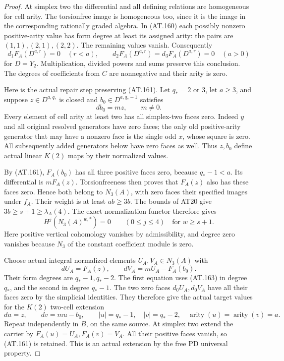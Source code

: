 \begin{proof}
At simplex two the differential and all defining
relations are homogeneous for cell arity.
The torsionfree image is homogeneous too, since
it is the image in the corresponding rationally
graded algebra. In (AT.160) each possibly nonzero
positive-arity value has form degree at least its
assigned arity: the pairs are $(1,1),(2,1),(2,2)$.
The remaining values vanish.
Consequently
\[
 d_1F_A(D^{a,r})=0\quad(r<a),\qquad
 d_2F_A(D^{a,r})=d_3F_A(D^{a,r})=0\quad(a>0)
 \tag{AT.161}
\]
for $D=Y_2$. Multiplication, divided powers and sums
preserve this conclusion. The degrees of coefficients
from $C$ are nonnegative and their arity is zero.

Here is the actual repair step preserving (AT.161).
Let $q_*=2$ or $3$, let $a\geq3$, and suppose
$z\in D^{a,q_*}$ is closed and
$b_0\in D^{a,q_*-1}$ satisfies
\[
                         db_0=mz,\qquad m\ne0.
 \tag{AT.162}
\]
Every element of cell arity at least two has all
simplex-two faces zero. Indeed $y$ and all original
resolved generators have zero faces; the only old
positive-arity generator that may have a nonzero
face is the single odd $x$, whose square is zero.
All subsequently added generators below have zero
faces as well. Thus $z,b_0$ define actual linear
$K(2)$ maps by their normalized values.

By (AT.161), $F_A(b_0)$ has all three positive faces
zero, because $q_*-1<a$.
Its differential is $mF_A(z)$.
Torsionfreeness then proves that $F_A(z)$ also has
these faces zero. Hence both belong to $N_3(A)$,
with zero faces their specified images under $f_A$.
Their weight is at least $ab\geq3b$.
The bounds of AT20 give
$3b\geq s+1\geq\lambda_A(4)$.
The exact normalization functor therefore gives
\[
             H^j(N_3(A)^{w,*})=0\qquad(0\leq j\leq4)
             \quad\text{for }w\geq s+1.
 \tag{AT.163}
\]
Here positive vertical cohomology vanishes by
admissibility, and degree zero vanishes because
$N_3$ of the constant coefficient module is zero.

Choose actual integral normalized elements
$U_A,V_A\in N_3(A)$ with
\[
                  dU_A=F_A(z),\qquad
                  dV_A=mU_A-F_A(b_0).
 \tag{AT.164}
\]
Their form degrees are $q_*-1,q_*-2$.
The first equation uses (AT.163) in degree $q_*$,
and the second in degree $q_*-1$.
The two zero faces $d_0U_A,d_0V_A$ have all their
faces zero by the simplicial identities.
They therefore give the actual target values for
the $K(2)$ two-cell extension
\[
       du=z,\qquad dv=mu-b_0,\qquad
       |u|=q_*-1,\quad |v|=q_*-2,
       \quad\operatorname{arity}(u)=\operatorname{arity}(v)=a.
 \tag{AT.165}
\]
Repeat independently in $B$, on the same source.
At simplex two extend the carrier by
$F_A(u)=U_A,F_A(v)=V_A$.
All their positive faces vanish, so (AT.161)
is retained. This is an actual extension by the
free PD universal property.


\end{proof}

